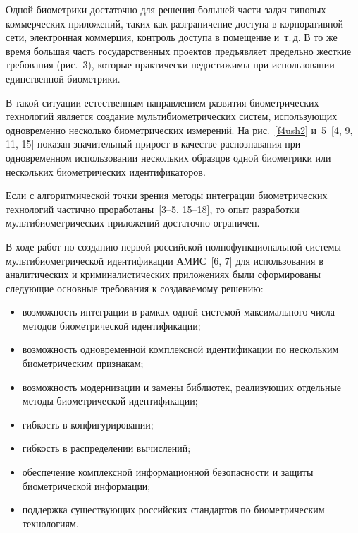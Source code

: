 \begin{multicols}{2}
  Одной биометрики достаточно для решения большей части задач типовых 
коммерческих приложений, таких как разграничение доступа в корпоративной сети, 
электронная коммерция, контроль доступа в помещение и~т.\,д. В то же время 
большая часть государственных проектов предъявляет предельно жесткие 
требования (рис.~3), которые практически недостижимы при 
использовании единственной биометрики.

 
  В такой ситуации естественным направлением развития биометрических 
технологий является создание мультибиометрических систем, использующих 
одновременно несколько биометрических измерений. На рис.~\ref{f4ush2} 
и~5~[4, 9, 11, 15] показан значительный прирост в качестве 
распознавания при одновременном использовании нескольких образцов одной 
биометрики или нескольких биометрических идентификаторов.
  
  
  
  Если с алгоритмической точки зрения методы интеграции биометрических 
технологий частично проработаны~[3--5, 15--18], то опыт разработки 
мультибиометрических приложений достаточно ограничен. 
  
  В ходе работ по созданию первой российской полнофункциональной 
системы мультибиометрической идентификации АМИС~[6, 7] для 
исполь\-зо\-ва\-ния в аналитических и криминалистических %
прило\-же\-ни\-ях были 
сформированы сле\-ду\-ющие основные требования к создаваемому решению:
  \begin{itemize}
\item возможность интеграции в рамках одной сис\-те\-мой максимального 
числа методов био\-мет\-ри\-че\-ской идентификации;
\item возможность одновременной комплексной идентификации по 
нескольким биометрическим признакам;
\item возможность модернизации и замены библиотек, реализующих 
отдельные методы биометрической идентификации;
\item гибкость в конфигурировании;
\item гибкость в распределении вычислений;
\item обеспечение комплексной информационной безопасности и защиты 
биометрической информации;
\item поддержка существующих российских стандартов по биометрическим 
технологиям.
\end{itemize}

 \end{multicols}

